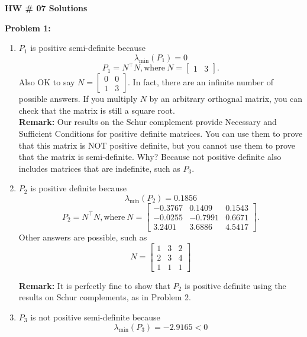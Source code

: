 \documentclass[letterpaper]{article}
\begin{document}
\newcommand{\trace}{\mathrm{trace}}
\newcommand{\real}{\mathbb R}  %
\newcommand{\nat}{\mathbb R}   %
\newcommand{\cp}{\mathbb C}    %
\newcommand{\ds}{\displaystyle}
\newcommand{\mf}[2]{\frac{\ds #1}{\ds #2}}
\newcommand{\book}[2]{{Luenberger, Page~#1, }{Prob.~#2}}
\newcommand{\spanof}[1]{\textrm{span} \{ #1 \}}
\parindent 0pt


\begin{center}
{\large \bf HW \# 07 Solutions}
\end{center}

\vspace*{1cm}

\noindent \textbf{Problem 1:}
\begin{enumerate}
\setlength{\itemsep}{.1in}
\renewcommand{\labelenumi}{(\alph{enumi})}
\item  $P_1$ is positive semi-definite because
$$ \lambda_{\min}(P_1) = 0 $$
$$P_1 = N^\top N, \text{where}~ N=\left[\begin{array}{rr} 1 & 3\end{array} \right].$$
Also OK to say $N=\left[ \begin{array}{rr}  0&   0\\  1&   3\end{array} \right].$ In fact, there are an infinite number of possible answers. If you multiply $N$ by an arbitrary orthognal matrix, you can check that the matrix is still a square root.\\

\noindent \textbf{Remark:} Our results on the Schur complement provide Necessary and Sufficient Conditions for positive definite matrices. You can use them to prove that this matrix is NOT positive definite, but you cannot use them to prove that the matrix is semi-definite. Why? Because not positive definite also includes matrices that are indefinite, such as $P_3$.

\item $P_2$ is positive definite because
$$\lambda_{\min}(P_2)=0.1856$$
$$P_2 = N^\top N, \text{where}~ N=\left[\begin{array}{rrrr} -0.3767 & 0.1409 & 0.1543\\ -0.0255 & -0.7991 & 0.6671 \\ 3.2401 & 3.6886 & 4.5417\end{array} \right].$$
Other answers are possible, such as
$$ N=\left[\begin{array}{rrr} 1 & 3 & 2\\ 2 & 3 & 4 \\ 1 & 1 & 1\end{array} \right]$$

\noindent \textbf{Remark:} It is perfectly fine to show that $P_2$ is positive definite using the results on Schur complements, as in Problem 2.

 \item $P_3$ is not positive semi-definite because
 $$\lambda_{\min}(P_3)=-2.9165<0$$
\end{enumerate}
\bigskip
\end{document}
